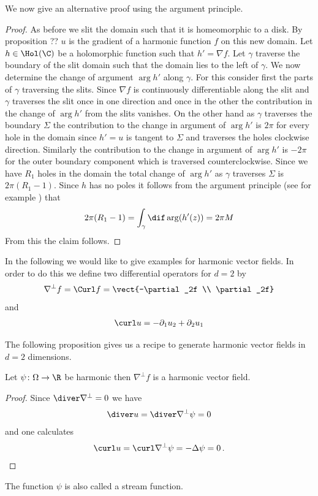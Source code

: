 We now give an alternative proof using the argument principle.
\begin{proof}
  As before we slit the domain such that it is homeomorphic to a disk. By proposition ?? $u$ is the gradient of a
  harmonic function $f$ on this new domain. Let $h\in\Hol(\C)$ be a holomorphic function such that $h'=\nabla f$.
  Let $\gamma$ traverse the boundary of the slit domain such that the domain lies to the left of $\gamma$.
  We now determine the change of argument $\arg h'$ along $\gamma$. For this
  consider first the parts of $\gamma$ traversing the slits. Since $\nabla f$ is continuously differentiable
  along the slit and $\gamma$ traverses the slit once in one direction and once in the other 
  the contribution in the change of $\arg h'$ from the slits vanishes.
  On the other hand as $\gamma$ traverses the boundary $\Sigma$ the contribution to the change in
  argument of $\arg h'$ is $2\pi$ for every hole in the domain 
  since $h'=u$ is tangent to $\Sigma$ and traverses the holes clockwise direction.
  Similarly the contribution to the change in argument of $\arg h'$ is $-2\pi$ for the outer boundary component
  which is traversed counterclockwise.
  Since we have $R_1$ holes in the domain the total change of $\arg h'$ as $\gamma$ traverses $\Sigma$ is
  $2\pi(R_1-1)$.
  Since $h$ has no poles it follows from the argument principle (see for example \cite[Chapter VIII]{Gamelin2001}) that
  \begin{align}
    2\pi(R_1-1)=\int_\gamma\dif\arg (h'(z)) =  2\pi M
  \end{align}
  From this the claim follows.
\end{proof}

In the following we would like to give examples for harmonic vector fields.
In order to do this we define two differential operators for $d=2$ by
\begin{align*}
  \nabla^\perp f=\Curl f=\vect{-\partial_2f \\ \partial_2f}
\end{align*}
and
\begin{align*}
  \curl u=-\partial_1u_2+\partial_2u_1
\end{align*}

The following proposition gives us a recipe to generate harmonic vector fields in $d=2$ dimensions.
\begin{proposition}
  Let $\psi\colon\Omega\to\R$ be harmonic then $\nabla^\perp f$ is a harmonic vector field.
\end{proposition} 
\begin{proof}
  Since $\diver \nabla^\perp=0$ we have
  \begin{align*}
    \diver u = \diver\nabla^\perp \psi=0
  \end{align*}
  and one calculates
  \begin{align*}
    \curl u = \curl\nabla^\perp \psi = -\Delta \psi = 0\,.
  \end{align*}
\end{proof}
The function $\psi$ is also called a stream function.


